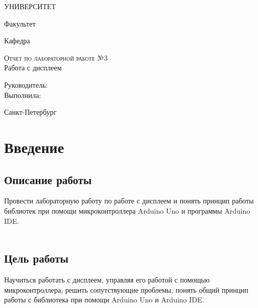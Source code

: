 \documentclass[12pt,a4paper]{scrartcl}
\begin{document}
\begin{titlepage}
  \begin{center}
    \large
 
    УНИВЕРСИТЕТ 
    \vspace{0.25cm}
     
    Факультет 
     
    Кафедра 
    \vfill
 
    \textsc{Отчет по лабораторной работе №3}\\[5mm]
     
    {\LARGE Работа с дисплеем}

\end{center}
\vfill
 
\newlength{\ML}
\hfill\begin{minipage}{0.4\textwidth}
  Руководитель:\\
  Выполнила:  \\

  
  
\end{minipage}%
\bigskip

 
\begin{center}
  Санкт-Петербург
\end{center}
\end{titlepage}

\begin{tableofcontents}
\end{tableofcontents}
    \newpage
    
\section{Введение}

\label{sec:intro}
 
\subsection{Описание работы}
Провести лабораторную работу по работе с дисплеем и понять принцип работы библиотек при помощи микроконтроллера Arduino Uno и программы Arduino IDE.\\
\\

\subsection{Цель работы}
Научиться работать с дисплеем, управляя его работой с помощью микроконтроллера, решить сопутствующие проблемы, понять общий принцип работы с библиотека при помощи Arduino Uno и Arduino IDE.
\end{document}
